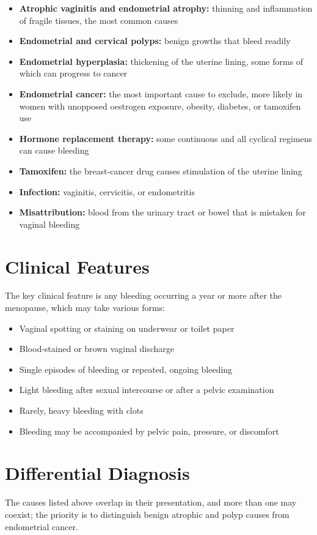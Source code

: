 \begin{itemize}
    \item \textbf{Atrophic vaginitis and endometrial atrophy:} thinning and inflammation of fragile tissues, the most common causes
    \item \textbf{Endometrial and cervical polyps:} benign growths that bleed readily
    \item \textbf{Endometrial hyperplasia:} thickening of the uterine lining, some forms of which can progress to cancer
    \item \textbf{Endometrial cancer:} the most important cause to exclude, more likely in women with unopposed oestrogen exposure, obesity, diabetes, or tamoxifen use
    \item \textbf{Hormone replacement therapy:} some continuous and all cyclical regimens can cause bleeding
    \item \textbf{Tamoxifen:} the breast-cancer drug causes stimulation of the uterine lining
    \item \textbf{Infection:} vaginitis, cervicitis, or endometritis
    \item \textbf{Misattribution:} blood from the urinary tract or bowel that is mistaken for vaginal bleeding
\end{itemize}

\section*{Clinical Features}
The key clinical feature is any bleeding occurring a year or more after the menopause, which may take various forms:

\begin{itemize}
    \item Vaginal spotting or staining on underwear or toilet paper
    \item Blood-stained or brown vaginal discharge
    \item Single episodes of bleeding or repeated, ongoing bleeding
    \item Light bleeding after sexual intercourse or after a pelvic examination
    \item Rarely, heavy bleeding with clots
    \item Bleeding may be accompanied by pelvic pain, pressure, or discomfort
\end{itemize}

\section*{Differential Diagnosis}
The causes listed above overlap in their presentation, and more than one may coexist; the priority is to distinguish benign atrophic and polyp causes from endometrial cancer.

